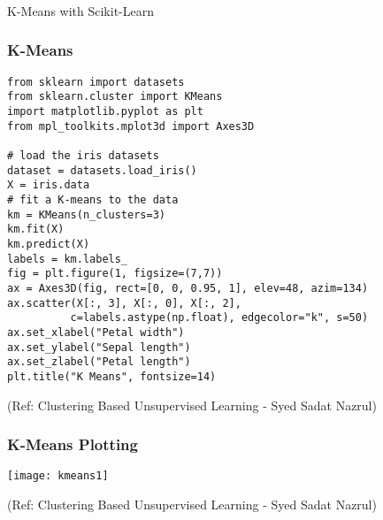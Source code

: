 \begin{frame}[fragile]\frametitle{}
\begin{center}
{\Large K-Means with Scikit-Learn}
\end{center}
\end{frame}


\begin{frame}[fragile]\frametitle{K-Means}
\begin{lstlisting}
from sklearn import datasets
from sklearn.cluster import KMeans
import matplotlib.pyplot as plt
from mpl_toolkits.mplot3d import Axes3D

# load the iris datasets
dataset = datasets.load_iris()
X = iris.data
# fit a K-means to the data
km = KMeans(n_clusters=3)
km.fit(X)
km.predict(X)
labels = km.labels_
fig = plt.figure(1, figsize=(7,7))
ax = Axes3D(fig, rect=[0, 0, 0.95, 1], elev=48, azim=134)
ax.scatter(X[:, 3], X[:, 0], X[:, 2],
          c=labels.astype(np.float), edgecolor="k", s=50)
ax.set_xlabel("Petal width")
ax.set_ylabel("Sepal length")
ax.set_zlabel("Petal length")
plt.title("K Means", fontsize=14)
\end{lstlisting}

{\tiny (Ref: Clustering Based Unsupervised Learning - Syed Sadat Nazrul)}

\end{frame}

\begin{frame}[fragile]\frametitle{K-Means Plotting}
\begin{center}
\texttt{[image: kmeans1]}
\end{center}

{\tiny (Ref: Clustering Based Unsupervised Learning - Syed Sadat Nazrul)}

\end{frame}



